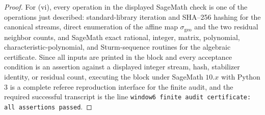 \begin{proof}
For \textup{(vi)}, every operation in the displayed SageMath check is one of the operations just described: standard-library iteration and SHA--256 hashing for the canonical streams, direct enumeration of the affine map \(\sigma_{\mathrm{geo}}\) and the two residual neighbor counts, and SageMath exact rational, integer, matrix, polynomial, characteristic-polynomial, and Sturm-sequence routines for the algebraic certificate.  Since all inputs are printed in the block and every acceptance condition is an assertion against a displayed integer stream, hash, stabilizer identity, or residual count, executing the block under SageMath \(10.x\) with Python \(3\) is a complete referee reproduction interface for the finite audit, and the required successful transcript is the line \texttt{window6 finite audit certificate: all assertions passed}. \qedhere
\end{proof}

